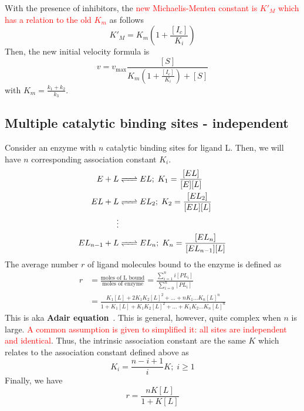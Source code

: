 With the presence of inhibitors, the
\textcolor{red}{new Michaelis-Menten constant is $K'_M$ which has a
  relation to the old $K_m$} as follows
\begin{equation}
  \label{eq:325}
  K'_M = K_m \left( 1 + \frac{[I_c]}{K_i} \right)
\end{equation}
Then, the new initial velocity formula
is~\citep{dixon1953eic,kakkar1999cei}
\begin{equation}
  \label{eq:328}
  v =  v_\max \frac{[S]}{ K_m \left( 1 + \frac{[I_c]}{K_i} \right)+[S]}
\end{equation}
with $K_m=\frac{k_1+k_2}{k_3}$.



\subsection{Multiple catalytic binding sites - independent}
\label{sec:mult-catalyt-bind}

Consider an enzyme with $n$ catalytic binding sites for ligand
L. Then, we will have $n$ corresponding association constant $K_i$.
\begin{equation}
  \label{eq:313}
  \begin{split}
    E + L &\ce{<=>} EL; \; K_1 = \frac{[EL]}{[E][L]} \\
    EL + L &\ce{<=>} EL_2; \; K_2 = \frac{[EL_2]}{[EL][L]} \\
    \vdots \\
    EL_{n-1} + L &\ce{<=>} EL_n; \; K_n = \frac{[EL_{n}]}{[EL_{n-1}][L]} 
  \end{split}
\end{equation}
The average number $r$ of ligand molecules bound to the enzyme is
defined as
\begin{equation}
  \label{eq:314}
  \begin{split}
      r &= \frac{\text{moles of L bound}}{\text{moles of enzyme}} =
  \frac{\sum^n_{i=1} i[PL_i]}{\sum_{i=0}^n [PL_i]} \\
  &= \frac{K_1[L]+2K_1K_2[L]^2 + \dots +
    nK_1...K_n[L]^n}{1+K_1[L]+K_1K_2[L]^2+\dots + K_1K_2...K_n[L]^n}
  \end{split}
\end{equation}
This is aka {\bf Adair equation}~\citep{adair1925odc}. This is general,
however, quite complex when $n$ is large.
\textcolor{red}{A common assumption is given to simplified it: all
  sites are independent and identical}.
Thus, the intrinsic association constant are the same $K$ which
relates to the association constant defined above as
\begin{equation}
  \label{eq:315}
  K_i = \frac{n-i+1}{i} K; \; i\ge 1
\end{equation}
Finally, we have
\begin{equation}
  \label{eq:316}
  r = \frac{nK[L]}{1+K[L]}
\end{equation}

